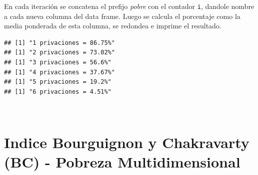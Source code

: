 \documentclass[
]{book}
\newenvironment{Shaded}{\begin{snugshade}}{\end{snugshade}}
\newcommand{\AttributeTok}[1]{\textcolor[rgb]{0.77,0.63,0.00}{#1}}
\newcommand{\CommentTok}[1]{\textcolor[rgb]{0.56,0.35,0.01}{\textit{#1}}}
\newcommand{\ConstantTok}[1]{\textcolor[rgb]{0.00,0.00,0.00}{#1}}
\newcommand{\ControlFlowTok}[1]{\textcolor[rgb]{0.13,0.29,0.53}{\textbf{#1}}}
\newcommand{\DecValTok}[1]{\textcolor[rgb]{0.00,0.00,0.81}{#1}}
\newcommand{\FunctionTok}[1]{\textcolor[rgb]{0.00,0.00,0.00}{#1}}
\newcommand{\NormalTok}[1]{#1}
\newcommand{\OtherTok}[1]{\textcolor[rgb]{0.56,0.35,0.01}{#1}}
\newcommand{\SpecialCharTok}[1]{\textcolor[rgb]{0.00,0.00,0.00}{#1}}
\newcommand{\StringTok}[1]{\textcolor[rgb]{0.31,0.60,0.02}{#1}}
\begin{document}
En cada iteración se concatena el prefijo \emph{pobre} con el contador \texttt{i}, dandole nombre a cada nueva columna del data frame. Luego se calcula el porcentaje como la media ponderada de esta columna, se redondea e imprime el resultado.

\begin{Shaded}
\end{Shaded}

\begin{verbatim}
## [1] "1 privaciones = 86.75%"
## [1] "2 privaciones = 73.02%"
## [1] "3 privaciones = 56.6%"
## [1] "4 privaciones = 37.67%"
## [1] "5 privaciones = 19.2%"
## [1] "6 privaciones = 4.51%"
\end{verbatim}

~

\hypertarget{indice-bourguignon-y-chakravarty-bc---pobreza-multidimensional}{%
\section{Indice Bourguignon y Chakravarty (BC) - Pobreza Multidimensional}\label{indice-bourguignon-y-chakravarty-bc---pobreza-multidimensional}}
\end{document}
